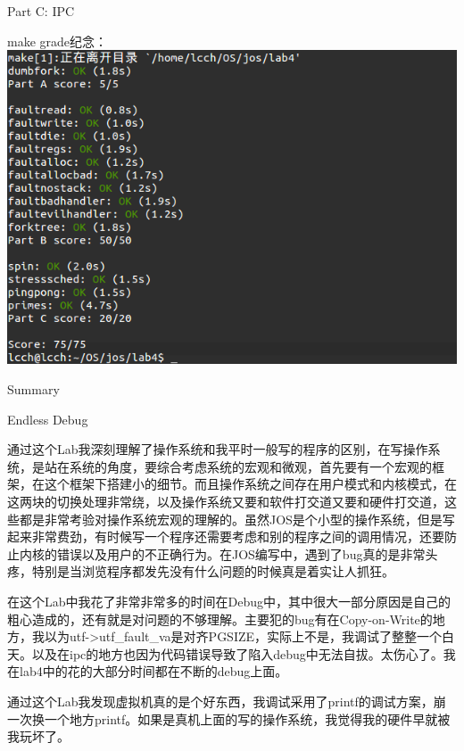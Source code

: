 \documentclass[GBK,winfonts,a4paper,10pt]{ctexart}
\begin{document}
\begin{section}{ Part C: IPC }
\par
make grade纪念：
\includegraphics[scale=0.5]{makegrade.png}
\end{section}

\begin{section}{ Summary }
\begin{subsection}{ Endless Debug }
\par
通过这个Lab我深刻理解了操作系统和我平时一般写的程序的区别，在写操作系统，是站在系统的角度，要综合考虑系统的宏观和微观，首先要有一个宏观的框架，在这个框架下搭建小的细节。而且操作系统之间存在用户模式和内核模式，在这两块的切换处理非常绕，以及操作系统又要和软件打交道又要和硬件打交道，这些都是非常考验对操作系统宏观的理解的。虽然JOS是个小型的操作系统，但是写起来非常费劲，有时候写一个程序还需要考虑和别的程序之间的调用情况，还要防止内核的错误以及用户的不正确行为。在JOS编写中，遇到了bug真的是非常头疼，特别是当浏览程序都发先没有什么问题的时候真是着实让人抓狂。
\par
在这个Lab中我花了非常非常多的时间在Debug中，其中很大一部分原因是自己的粗心造成的，还有就是对问题的不够理解。主要犯的bug有在Copy-on-Write的地方，我以为utf->utf\_fault\_va是对齐PGSIZE，实际上不是，我调试了整整一个白天。以及在ipc的地方也因为代码错误导致了陷入debug中无法自拔。太伤心了。我在lab4中的花的大部分时间都在不断的debug上面。
\par
通过这个Lab我发现虚拟机真的是个好东西，我调试采用了printf的调试方案，崩一次换一个地方printf。如果是真机上面的写的操作系统，我觉得我的硬件早就被我玩坏了。
\end{subsection}
\end{section}
\end{document}
